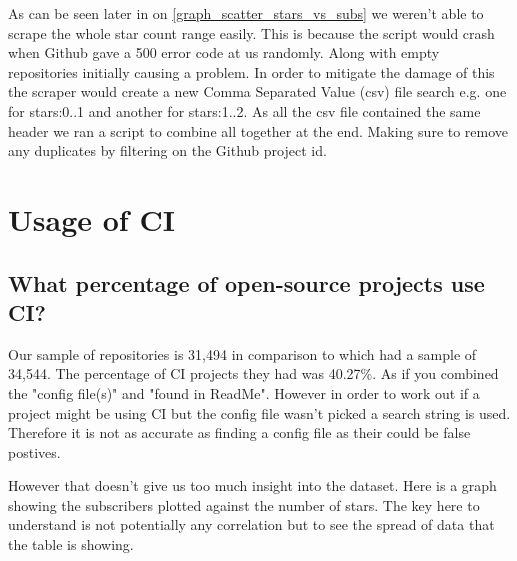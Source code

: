 \documentclass[twoside,12pt,titlepage,a4paper]{article}
\begin{document}
As can be seen later in on \ref{graph_scatter_stars_vs_subs} we weren't able to scrape the whole star count range easily. This is because the script would crash when Github gave a 500 error code at us randomly. Along with empty repositories initially causing a problem. In order to mitigate the damage of this the scraper would create a new Comma Separated Value (csv) file search e.g. one for stars:0..1 and another for stars:1..2. As all the csv file contained the same header we ran a script to combine all together at the end. Making sure to remove any duplicates by filtering on the Github project id.


\section{Usage of CI}

\vspace*{-0.05in}
\subsection{What percentage of open-source projects use CI?}
\vspace*{-0.05in}



Our sample of repositories is 31,494 in comparison to \citet{Hilton2016} which had a sample of 34,544. The percentage of CI projects they had was 40.27\%. As if you combined the "config file(s)" and "found in ReadMe". However in order to work out if a project might be using CI but the config file wasn't picked a search string is used. Therefore it is not as accurate as finding a config file as their could be false postives.

However that doesn't give us too much insight into the dataset. Here is a graph showing the subscribers plotted against the number of stars. The key here to understand is not potentially any correlation but to see the spread of data that the table is showing. 
\end{document}
